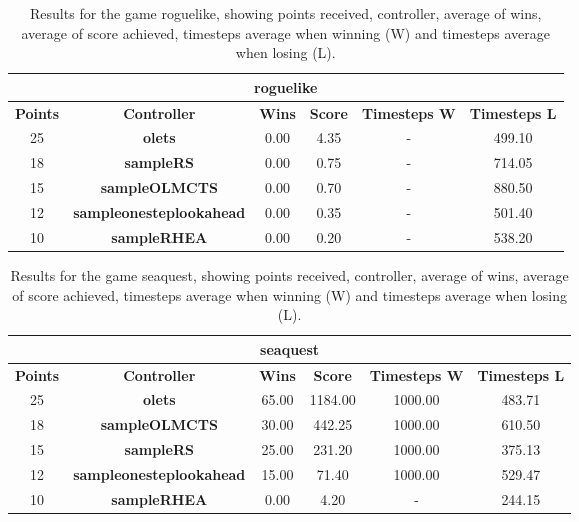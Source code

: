 \begin{table*}[!t]
\begin{center}
\begin{tabular}{|c|c|c|c|c|c|}
\multicolumn{6}{c}{\textbf{roguelike}}\\
\hline
\textbf{Points} & \textbf{Controller} & \textbf{Wins} &  \textbf{Score} & \textbf{Timesteps W} & \textbf{Timesteps L}\\
\hline
25 & \textbf{olets} & 0.00 & 4.35 &  -  & 499.10
 \\
\hline
18 & \textbf{sampleRS} & 0.00 & 0.75 &  -  & 714.05
 \\
\hline
15 & \textbf{sampleOLMCTS} & 0.00 & 0.70 &  -  & 880.50
 \\
\hline
12 & \textbf{sampleonesteplookahead} & 0.00 & 0.35 &  -  & 501.40
 \\
\hline
10 & \textbf{sampleRHEA} & 0.00 & 0.20 &  -  & 538.20
 \\
\hline
\end{tabular}
\caption{Results for the game roguelike, showing points received, controller, average of wins, average of score achieved, timesteps average when winning (W) and timesteps average when losing (L).}
\label{tab:weights}
\end{center}
\end{table*}
\begin{table*}[!t]
\begin{center}
\begin{tabular}{|c|c|c|c|c|c|}
\multicolumn{6}{c}{\textbf{seaquest}}\\
\hline
\textbf{Points} & \textbf{Controller} & \textbf{Wins} &  \textbf{Score} & \textbf{Timesteps W} & \textbf{Timesteps L}\\
\hline
25 & \textbf{olets} & 65.00 & 1184.00 & 1000.00 & 483.71
 \\
\hline
18 & \textbf{sampleOLMCTS} & 30.00 & 442.25 & 1000.00 & 610.50
 \\
\hline
15 & \textbf{sampleRS} & 25.00 & 231.20 & 1000.00 & 375.13
 \\
\hline
12 & \textbf{sampleonesteplookahead} & 15.00 & 71.40 & 1000.00 & 529.47
 \\
\hline
10 & \textbf{sampleRHEA} & 0.00 & 4.20 &  -  & 244.15
 \\
\hline
\end{tabular}
\caption{Results for the game seaquest, showing points received, controller, average of wins, average of score achieved, timesteps average when winning (W) and timesteps average when losing (L).}
\label{tab:weights}
\end{center}
\end{table*}
